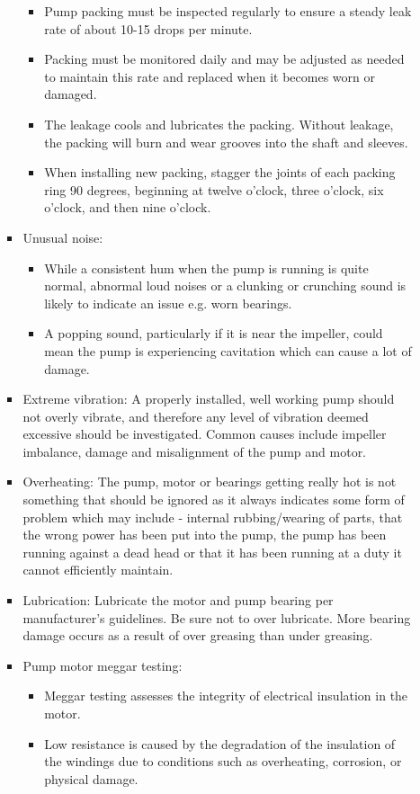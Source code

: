 \begin{itemize}
\begin{itemize}
\begin{itemize}
\begin{itemize}
\item Pump packing must be inspected regularly to ensure a steady leak rate of about 10-15 drops per minute.
\item Packing must be monitored daily and may be adjusted as needed to maintain this rate and replaced when it becomes worn or damaged.  
\item The leakage cools and lubricates the packing.  Without leakage, the packing will burn and wear grooves into the shaft and sleeves.
\item When installing new packing, stagger the joints of each packing ring 90 degrees, beginning at twelve o’clock, three o’clock, six o’clock, and then nine o’clock.
\end{itemize}
\item Unusual noise:
\begin{itemize}
\item While a consistent hum when the pump is running is quite normal, abnormal loud noises or a clunking or crunching sound is likely to indicate an issue e.g. worn bearings.
\item A popping sound, particularly if it is near the impeller, could mean the pump is experiencing cavitation which can cause a lot of damage.
\end{itemize}
\item Extreme vibration: A properly installed, well working pump should not overly vibrate, and therefore any level of vibration deemed excessive should be investigated. Common causes include impeller imbalance, damage and misalignment of the pump and motor.
\item Overheating: The pump, motor or bearings getting really hot is not something that should be ignored as it always indicates some form of problem which may include - internal rubbing/wearing of parts, that the wrong power has been put into the pump, the pump has been running against a dead head or that it has been running at a duty it cannot efficiently maintain.
\item Lubrication: Lubricate the motor and pump bearing per manufacturer's guidelines. Be sure not to over lubricate. More bearing damage occurs as a result of over greasing than under greasing.
\item Pump motor meggar testing:
\begin{itemize}
\item Meggar testing assesses the integrity of electrical insulation in the motor.
\item Low resistance is caused by the degradation of the insulation of the windings due to conditions such as overheating, corrosion, or physical damage.

\end{itemize}
\end{itemize}
\end{itemize}
\end{itemize}
